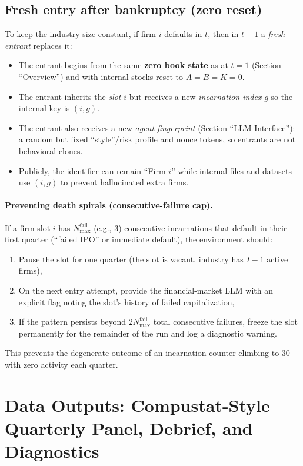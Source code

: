 \documentclass[11pt]{article}
\begin{document}
\subsection{Fresh entry after bankruptcy (zero reset)}
To keep the industry size constant, if firm $i$ defaults in $t$, then in $t+1$ a \emph{fresh entrant} replaces it:
\begin{itemize}[leftmargin=*]
    \item The entrant begins from the same \textbf{zero book state} as at $t=1$ (Section ``Overview'') and with internal stocks reset to $A=B=K=0$.
    \item The entrant inherits the \emph{slot} $i$ but receives a new \emph{incarnation index} $g$ so the internal key is $(i,g)$.
    \item The entrant also receives a new \emph{agent fingerprint} (Section ``LLM Interface''): a random but fixed ``style''/risk profile and nonce tokens, so entrants are not behavioral clones.
    \item Publicly, the identifier can remain ``Firm $i$'' while internal files and datasets use $(i,g)$ to prevent hallucinated extra firms.
\end{itemize}

\paragraph{Preventing death spirals (consecutive-failure cap).}
If a firm slot $i$ has $N_{\max}^{\text{fail}}$ (e.g., 3) consecutive incarnations that default in their first quarter (``failed IPO'' or immediate default), the environment should:
\begin{enumerate}[leftmargin=*]
    \item Pause the slot for one quarter (the slot is vacant, industry has $I-1$ active firms),
    \item On the next entry attempt, provide the financial-market LLM with an explicit flag noting the slot's history of failed capitalization,
    \item If the pattern persists beyond $2 N_{\max}^{\text{fail}}$ total consecutive failures, freeze the slot permanently for the remainder of the run and log a diagnostic warning.
\end{enumerate}
This prevents the degenerate outcome of an incarnation counter climbing to $30+$ with zero activity each quarter.

\section{Data Outputs: Compustat-Style Quarterly Panel, Debrief, and Diagnostics}
\end{document}
